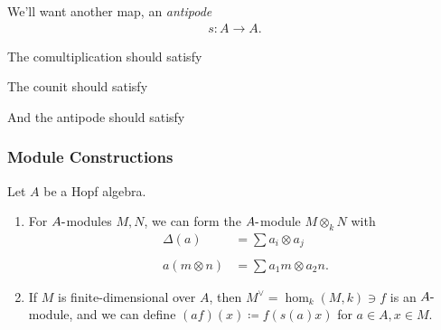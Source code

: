 We'll want another map, an \emph{antipode}
\begin{align*}  
s: A\to A
.\end{align*}

The comultiplication should satisfy

\begin{center}
\end{center}

The counit should satisfy

\begin{center}
\end{center}

And the antipode should satisfy

\begin{center}
\end{center}

\hypertarget{module-constructions}{%
\subsubsection{Module Constructions}\label{module-constructions}}

Let \(A\) be a Hopf algebra.

\begin{enumerate}
\def\labelenumi{\arabic{enumi}.}
\item
  For \(A{\hbox{-}}\)modules \(M, N\), we can form the
  \(A{\hbox{-}}\)module \(M\otimes_k N\) with
  \begin{align*}  
  \Delta(a) &= \sum a_i \otimes a_j \\ \\
  a(m\otimes n) &= \sum a_1 m \otimes a_2 n
  .\end{align*}
\item
  If \(M\) is finite-dimensional over \(A\), then
  \(M^\vee= \hom_k(M, k) \ni f\) is an \(A{\hbox{-}}\)module, and we can
  define \((af)(x) \coloneqq f(s(a)x)\) for \(a\in A, x\in M\).
\end{enumerate}

